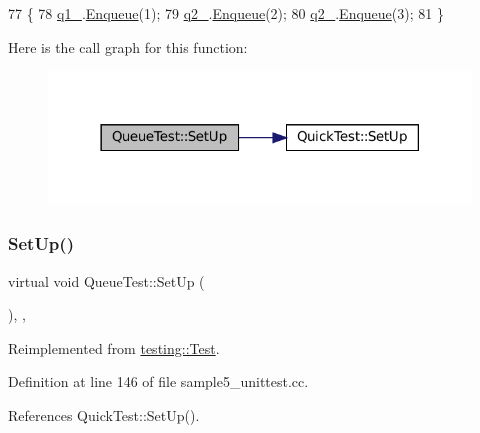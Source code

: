 \begin{DoxyCode}
77                        \{
78     \hyperlink{classQueueTest_a1e55594e71820ba0f1b09591fb328c30}{q1\_}.\hyperlink{classQueue_abaa2e7175457307bca74f5562cbdaaa9}{Enqueue}(1);
79     \hyperlink{classQueueTest_aeb7a2e3f6ce2d97d84eb1e01468adc2f}{q2\_}.\hyperlink{classQueue_abaa2e7175457307bca74f5562cbdaaa9}{Enqueue}(2);
80     \hyperlink{classQueueTest_aeb7a2e3f6ce2d97d84eb1e01468adc2f}{q2\_}.\hyperlink{classQueue_abaa2e7175457307bca74f5562cbdaaa9}{Enqueue}(3);
81   \}
\end{DoxyCode}
Here is the call graph for this function\+:
\nopagebreak
\begin{figure}[H]
\begin{center}
\leavevmode
\includegraphics[width=318pt]{classQueueTest_a91e69958f086239a523864d6b94ab174_cgraph}
\end{center}
\end{figure}
\mbox{\label{classQueueTest_a91e69958f086239a523864d6b94ab174}} 
\subsubsection{\texorpdfstring{Set\+Up()}{SetUp()}\hspace{0.1cm}{\footnotesize\ttfamily [2/2]}}
{\footnotesize\ttfamily virtual void Queue\+Test\+::\+Set\+Up (\begin{DoxyParamCaption}{ }\end{DoxyParamCaption})\hspace{0.3cm}{\ttfamily [inline]}, {\ttfamily [protected]}, {\ttfamily [virtual]}}



Reimplemented from \hyperlink{classtesting_1_1Test_a57a4116f39f6636a80710ded7d42e889}{testing\+::\+Test}.



Definition at line 146 of file sample5\+\_\+unittest.\+cc.



References Quick\+Test\+::\+Set\+Up().


